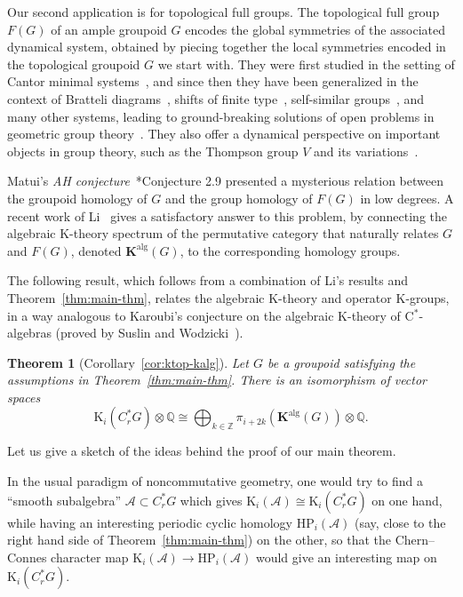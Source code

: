 \documentclass[a4paper,reqno]{amsart}
\theoremstyle{plain}
\newtheorem{theoremA}{Theorem}
\theoremstyle{definition}
\theoremstyle{remark}
\numberwithin{equation}{section}
\newcommand{\rK}{\mathrm{K}}
\newcommand{\dQ}{\mathbb{Q}}
\newcommand{\dZ}{\mathbb{Z}}
\newcommand{\bK}{\mathbf{K}}
\begin{document}
Our second application is for topological full groups.
The topological full group $F(G)$ of an ample groupoid $G$ encodes the global symmetries of the associated dynamical system, obtained by piecing together the local symmetries encoded in the topological groupoid $G$ we start with.
They were first studied in the setting of Cantor minimal systems~\cite{kri:dim}, and since then they have been generalized in the context of Bratteli diagrams~\cite{gps:full}, shifts of finite type~\cite{matui:fgsft}, self-similar groups~\cite{nekra:fp}, and many other systems, leading to ground-breaking solutions of open problems in geometric group theory~\cites{nekra:int,swz:typef}.
They also offer a dynamical perspective on important objects in group theory, such as the Thompson group $V$ and its variations~\cite{nekra:v}.

Matui's \emph{AH conjecture}~\cite{matui:hkpub}*{Conjecture 2.9} presented a mysterious relation between the groupoid homology of $G$ and the group homology of $F(G)$ in low degrees.
A recent work of Li~\cite{li:algk} gives a satisfactory answer to this problem, by connecting the algebraic $\rK$-theory spectrum of the permutative category that naturally relates $G$ and $F(G)$, denoted $\bK^{\mathrm{alg}}(G)$, to the corresponding homology groups.

The following result, which follows from a combination of Li's results and Theorem~\ref{thm:main-thm}, relates the algebraic $\rK$-theory and operator $\rK$-groups, in a way analogous to Karoubi's conjecture on the algebraic $\rK$-theory of C$^*$-algebras (proved by Suslin and Wodzicki~\cite{suswod:karoubi}).

\begin{theoremA}[Corollary~\ref{cor:ktop-kalg}]%
Let $G$ be a groupoid satisfying the assumptions in Theorem~\ref{thm:main-thm}. There is an isomorphism of vector spaces
\[
\rK_i(C^*_r G) \otimes \dQ \cong  \bigoplus_{k\in \dZ}\pi_{i+2k} (\bK^{\mathrm{alg}}(G))\otimes \dQ.
\]
\end{theoremA}

Let us give a sketch of the ideas behind the proof of our main theorem.

In the usual paradigm of noncommutative geometry, one would try to find a ``smooth subalgebra'' $\mathcal{A} \subset C^*_r G$ which gives $\rK_i(\mathcal{A}) \cong \rK_i(C^*_r G)$ on one hand, while having an interesting periodic cyclic homology $\mathrm{HP}_i(\mathcal{A})$ (say, close to the right hand side of Theorem~\ref{thm:main-thm}) on the other, so that the Chern--Connes character map $\rK_i(\mathcal{A}) \to \mathrm{HP}_i(\mathcal{A})$ would give an interesting map on $\rK_i(C^*_r G)$.
\end{document}
